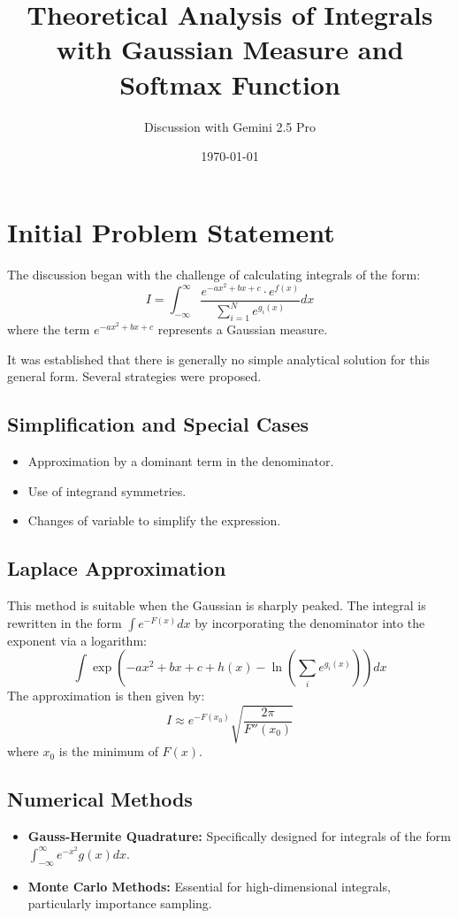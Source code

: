 \documentclass[12pt]{article}
\title{Theoretical Analysis of Integrals with Gaussian Measure and Softmax Function}
\author{Discussion with Gemini 2.5 Pro}
\date{\today}
\begin{document}
\maketitle

\section{Initial Problem Statement}

The discussion began with the challenge of calculating integrals of the form:
\[
I = \int_{-\infty}^{\infty} \frac{e^{-ax^2 + bx + c} \cdot e^{f(x)}}{\sum_{i=1}^{N} e^{g_i(x)}} dx
\]
where the term $e^{-ax^2+bx+c}$ represents a Gaussian measure.

It was established that there is generally no simple analytical solution for this general form. Several strategies were proposed.

\subsection{Simplification and Special Cases}
\begin{itemize}
    \item Approximation by a dominant term in the denominator.
    \item Use of integrand symmetries.
    \item Changes of variable to simplify the expression.
\end{itemize}

\subsection{Laplace Approximation}
This method is suitable when the Gaussian is sharply peaked. The integral is rewritten in the form $\int e^{-F(x)} dx$ by incorporating the denominator into the exponent via a logarithm:
\[
\int \exp\left(-ax^2 + bx + c + h(x) - \ln\left(\sum_i e^{g_i(x)}\right)\right) dx
\]
The approximation is then given by:
\[
I \approx e^{-F(x_0)} \sqrt{\frac{2\pi}{F''(x_0)}}
\]
where $x_0$ is the minimum of $F(x)$.

\subsection{Numerical Methods}
\begin{itemize}
    \item \textbf{Gauss-Hermite Quadrature:} Specifically designed for integrals of the form $\int_{-\infty}^{\infty} e^{-x^2} g(x) dx$.
    \item \textbf{Monte Carlo Methods:} Essential for high-dimensional integrals, particularly importance sampling.
\end{itemize}
\end{document}
